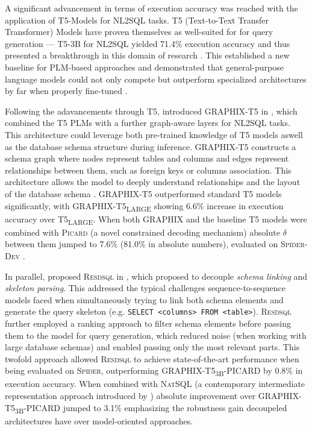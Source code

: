 \documentclass{article}
\begin{document}
A significant advancement in terms of execution accuracy was reached with the application of T5-Models for NL2SQL tasks. T5
(Text-to-Text Transfer Transformer) Models have proven themselves as well-suited for for query generation — T5-3B for NL2SQL
yielded 71.4\% execution accuracy and thus presented a breakthrough in this domain of research \citep{T2SQL-LLM-Bench-3}.
This established a new baseline for PLM-based approaches and demonstrated that general-purpose language models could not
only compete but outperform specialized architectures by far when properly fine-tuned \citep{T2SQL-LLM-Bench-3}.

Following the adavancements through T5, \citeauthor*{GRAPHIX} introduced GRAPHIX-T5 in \citeyear{GRAPHIX}, which combined
the T5 PLMs with a further graph-aware layers for NL2SQL tasks. This architecture could leverage both pre-trained knowledge
of T5 models aswell as the database schema structure during inference. GRAPHIX-T5 constructs a schema graph where nodes
represent tables and columns and edges represent relationships between them, such as foreign keys or columns association.
This architecture allows the model to deeply understand relationships and the layout of the database schema \citep{GRAPHIX}. 
GRAPHIX-T5 outperformed standard T5 models significantly, with GRAPHIX-T5\textsubscript{\tiny{LARGE}} showing 6.6\% increase
in execution accuracy over T5\textsubscript{\tiny{LARGE}}. When both GRAPHIX and the baseline T5 models were combined with
\textsc{Picard} (a novel constrained decoding mechanism) absolute $\delta$ between them jumped to 7.6\% (81.0\% in absolute
numbers), evaluated on \textsc{Spider-Dev} \citep{GRAPHIX}.

In parallel, \citeauthor*{RESDSQL} proposed \textsc{Resdsql} in \citeyear{RESDSQL}, which proposed to decouple
\textit{schema linking} and \textit{skeleton parsing}. This addressed the typical challenges sequence-to-sequence models
faced when simultaneously trying to link both schema elements and generate the query skeleton (e.g. 
\texttt{SELECT <columns> FROM <table>}). \textsc{Resdsql} further employed a ranking approach to filter schema elements
before passing them to the model for query generation, which reduced noise (when working with large database schemas)
and enabled passing only the most relevant parts. This twofold approach allowed \textsc{Resdsql} to achieve state-of-the-art
performance when being evaluated on \textsc{Spider}, outperforming GRAPHIX-T5\textsubscript{\tiny{3B}}-PICARD by 0.8\% in
execution accuracy. When combined with \textsc{NatSQL} (a contemporary intermediate representation approach introduced
by \cite{NATSQL}) absolute improvement over GRAPHIX-T5\textsubscript{\tiny{3B}}-PICARD jumped to 3.1\% emphasizing the
robustness gain decoupeled architectures have over model-oriented approaches.
\end{document}
